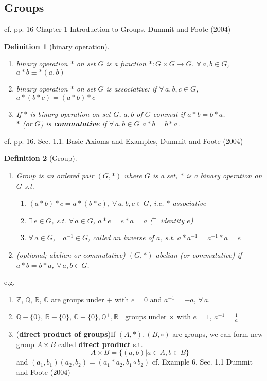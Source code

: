 \documentclass[10pt]{amsart}
\newtheorem{definition}{Definition}
\begin{document}
\begin{multicols*}{2}
\section{Groups}
cf. pp. 16 Chapter 1 Introduction to Groups. Dummit and Foote (2004) \cite{DuFo2003}
\begin{definition}[binary operation]
	\begin{enumerate}
		\item binary operation $*$ on set $G$ is a function $*: G \times G \to G$.  $\forall \, a, b \in G$, $a* b \equiv *(a,b)$
		\item binary operation $*$ on set $G$ is \emph{associative}: if $\forall \, a, b, c \in G$, $a*(b*c) = (a*b) * c$ 
		\item If $*$ is binary operation on set $G$, $a,b $ of $G$ commut if $a*b = b*a$. \\
		$*$ (or $G$) is \textbf{commutative} if $\forall \, a, b \in G$ $a* b = b*a$.  
	\end{enumerate}
\end{definition}
cf. pp. 16. Sec. 1.1. Basic Axioms and Examples, Dummit and Foote (2004) \cite{DuFo2003} 

\begin{definition}[Group]
\begin{enumerate}
\item Group is an ordered pair $(G, *)$ where $G$ is a set, $*$ is a binary operation on $G$ s.t. 
\begin{enumerate}
\item $(a*b)*c = a*(b*c)$, $\forall \, a,b ,c \in G$, i.e. $*$ \emph{associative}
\item $\exists \, e \in G$, s.t. $\forall \, a\in G$, $a*e = e*a = a$  ($\exists \, $ \emph{identity} $e$)
\item $\forall \, a\in G$, $\exists \, a^{-1}\in G$, called an \emph{inverse} of $a$, s.t. $a*a^{-1} = a^{-1} * a = e$
\end{enumerate}
\item (optional; abelian or \emph{commutative}) $(G,*)$ abelian (or commutative) if $a*b = b*a$, $\forall \, a,b \in G$. 
\end{enumerate}
\end{definition}
e.g.
\begin{enumerate}
\item  $\mathbb{Z}$, $\mathbb{Q}$, $\mathbb{R}$, $\mathbb{C}$ are groups under $+$ with $e=0$ and $a^{-1} = -a$, $\forall \, a$. 
\item $\mathbb{Q} - \lbrace 0 \rbrace$, $\mathbb{R} - \lbrace 0 \rbrace$, $\mathbb{C} - \lbrace 0 \rbrace, \mathbb{Q}^+, \mathbb{R}^+$ groups under $\times$ with $e=1$, $a^{-1} = \frac{1}{a}$
\item (\textbf{direct product of groups})If $(A,*), (B,\circ)$ are groups, we can form new group $A\times B$ called \textbf{direct product} s.t.
\[
A \times B = \lbrace (a,b) | a\in A, b\in B\rbrace
\] and $(a_1,b_1)(a_2,b_2) = (a_1*a_2, b_1 \circ b_2)$ cf. Example 6, Sec. 1.1 Dummit and Foote (2004) \cite{DuFo2003}
\end{enumerate}


\end{multicols*}
\end{document}
